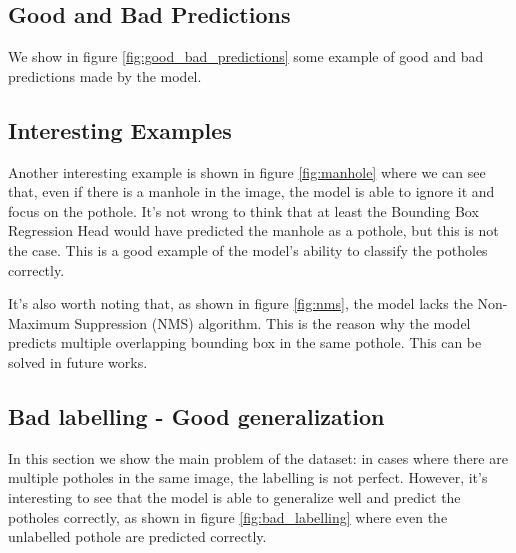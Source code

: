 \subsection*{Good and Bad Predictions}
We show in figure \ref{fig:good_bad_predictions} some example of good and bad predictions made by the model. 

\subsection*{Interesting Examples}
Another interesting example is shown in figure \ref{fig:manhole} where we can see that, even if there is a manhole in the image, the model is able to ignore it and focus on the pothole. It's not wrong to think that at least the Bounding Box Regression Head would have predicted the manhole as a pothole, but this is not the case. This is a good example of the model's ability to classify the potholes correctly.

It's also worth noting that, as shown in figure \ref{fig:nms}, the model lacks the Non-Maximum Suppression (NMS) algorithm. This is the reason why the model predicts multiple overlapping bounding box in the same pothole. This can be solved in future works.


\subsection*{Bad labelling - Good generalization}
In this section we show the main problem of the dataset: in cases where there are multiple potholes in the same image, the labelling is not perfect.
However, it's interesting to see that the model is able to generalize well and predict the potholes correctly, as shown in figure \ref{fig:bad_labelling} where even the unlabelled pothole are predicted correctly.


